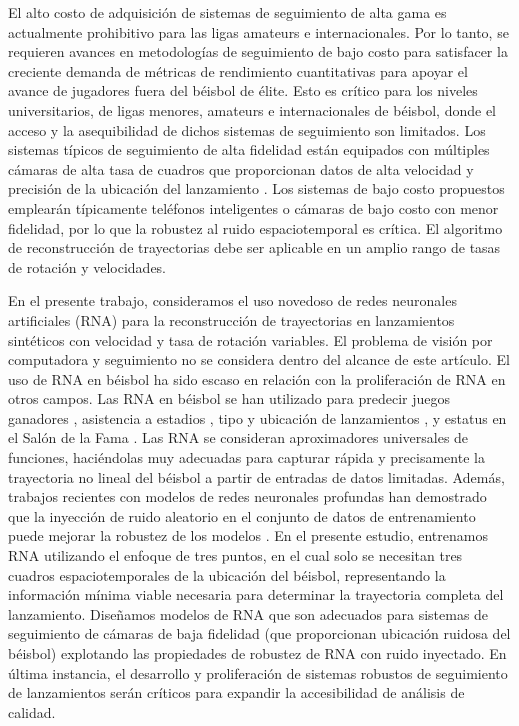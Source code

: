 \documentclass[12pt,a4paper]{article}
\begin{document}
El alto costo de adquisición de sistemas de seguimiento de alta gama es actualmente prohibitivo para las ligas amateurs e internacionales. Por lo tanto, se requieren avances en metodologías de seguimiento de bajo costo para satisfacer la creciente demanda de métricas de rendimiento cuantitativas para apoyar el avance de jugadores fuera del béisbol de élite. Esto es crítico para los niveles universitarios, de ligas menores, amateurs e internacionales de béisbol, donde el acceso y la asequibilidad de dichos sistemas de seguimiento son limitados. Los sistemas típicos de seguimiento de alta fidelidad están equipados con múltiples cámaras de alta tasa de cuadros que proporcionan datos de alta velocidad y precisión de la ubicación del lanzamiento \citep{kim2019}. Los sistemas de bajo costo propuestos emplearán típicamente teléfonos inteligentes o cámaras de bajo costo con menor fidelidad, por lo que la robustez al ruido espaciotemporal es crítica. El algoritmo de reconstrucción de trayectorias debe ser aplicable en un amplio rango de tasas de rotación y velocidades.

En el presente trabajo, consideramos el uso novedoso de redes neuronales artificiales (RNA) para la reconstrucción de trayectorias en lanzamientos sintéticos con velocidad y tasa de rotación variables. El problema de visión por computadora y seguimiento no se considera dentro del alcance de este artículo. El uso de RNA en béisbol ha sido escaso en relación con la proliferación de RNA en otros campos. Las RNA en béisbol se han utilizado para predecir juegos ganadores \citep{huang2021}, asistencia a estadios \citep{park2017}, tipo y ubicación de lanzamientos \citep{lee2022}, y estatus en el Salón de la Fama \citep{smith2009}. Las RNA se consideran aproximadores universales de funciones, haciéndolas muy adecuadas para capturar rápida y precisamente la trayectoria no lineal del béisbol a partir de entradas de datos limitadas. Además, trabajos recientes con modelos de redes neuronales profundas han demostrado que la inyección de ruido aleatorio en el conjunto de datos de entrenamiento puede mejorar la robustez de los modelos \citep{fawzi2016,he2019,sietsma1991}. En el presente estudio, entrenamos RNA utilizando el enfoque de tres puntos, en el cual solo se necesitan tres cuadros espaciotemporales de la ubicación del béisbol, representando la información mínima viable necesaria para determinar la trayectoria completa del lanzamiento. Diseñamos modelos de RNA que son adecuados para sistemas de seguimiento de cámaras de baja fidelidad (que proporcionan ubicación ruidosa del béisbol) explotando las propiedades de robustez de RNA con ruido inyectado. En última instancia, el desarrollo y proliferación de sistemas robustos de seguimiento de lanzamientos serán críticos para expandir la accesibilidad de análisis de calidad.
\end{document}
